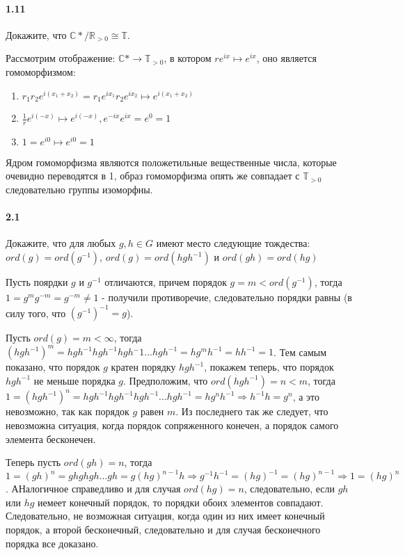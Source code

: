 \documentclass[a4paper,12pt]{article}
\begin{document}
\paragraph{1.11} Докажите, что ${\mathbb{C}*}/{\mathbb{R}_{>0}} \cong \mathbb{T}$.

\begin{Solution}
Рассмотрим отображение: $\mathbb{C}* \rightarrow \mathbb{T}_{>0}$, в котором $re^{ix} \mapsto e^{ix}$, оно является гомоморфизмом:
\begin{enumerate}
\item $r_1 r_2 e^{i \left(x_1 + x_2\right)} = r_1 e^{i x_1} r_2 e^{i x_2} \mapsto e^{i \left(x_1 + x_2\right)}$

\item $\frac{1}{r} e^{i \left(-x\right)} \mapsto e^{i \left(-x\right)}, e^{- i x} e^{i x} = e^0 = 1$

\item $1 = e^{i 0} \mapsto e^{i 0} = 1$
\end{enumerate}
Ядром гомоморфизма являются положетильные вещественные числа, которые очевидно переводятся в 1, образ гомоморфизма опять же совпадает с $\mathbb{T}_{>0}$следовательно группы изоморфны.
\end{Solution}

\paragraph{2.1} Докажите, что для любых $g, h \in G$ имеют место следующие тождества: $ord(g) = ord(g^{-1})$, $ord(g) = ord(hgh^{-1})$ и $ord(gh) = ord(hg)$

\begin{Solution}
Пусть поярдки $g$ и $g^{-1}$ отличаются, причем порядок $g = m < ord(g^{-1})$, тогда $1 = g^mg^{-m} = g^{-m} \not= 1$ - получили противоречие, следовательно порядки равны (в силу того, что $(g^{-1})^{-1} = g$).

Пусть $ord(g) = m < \infty$, тогда $(hgh^{-1})^m = hgh^{-1}hgh^{-1}hgh{^-1}... hgh^{-1} = h g^m h^{-1} = h h^{-1} = 1$. Тем самым показано, что порядок $g$ кратен порядку $hgh^{-1}$, покажем теперь, что порядок $hgh^{-1}$ не меньше порядка $g$. Предположим, что $ord(hgh^{-1}) = n < m$, тогда $1 = (hgh^{-1})^n = hgh^{-1}hgh^{-1}hgh^{-1}...hgh^{-1} = hg^nh^{-1} \Rightarrow h^{-1}h = g^n$, а это невозможно, так как порядок $g$ равен $m$. Из последнего так же следует, что невозможна ситуация, когда порядок сопряженного конечен, а порядок самого элемента бесконечен.

Теперь пусть $ord(gh) = n$, тогда $1 = (gh)^n = ghghgh...gh = g (hg)^{n-1} h \Rightarrow g^{-1}h^{-1} = (hg)^{-1} = (hg)^{n-1} \Rightarrow 1 = (hg)^n$. АНалогичное справедливо и для случая $ord(hg) = n$, следовательно, если $gh$ или $hg$ иемеет конечный порядок, то порядки обоих элементов совпадают. Следовательно, не возможная ситуация, когда один из них имеет конечный порядок, а второй бесконечный, следовательно и для случая бесконечного порядка все доказано.
\end{Solution}
\end{document}
